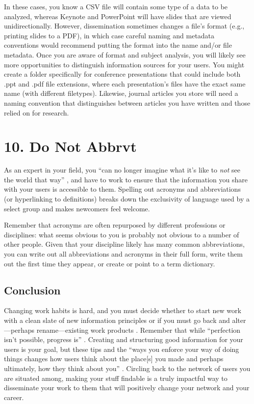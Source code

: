 \documentclass[10pt,letterpaper]{article}
\newcommand{\rulemajor}[1]{\section*{#1}}
\begin{document}
In these cases, you know a CSV file will contain some type of a data to be
analyzed, whereas Keynote and PowerPoint will have slides that are viewed
unidirectionally. However, dissemination sometimes changes a file's format
(e.g., printing slides to a PDF), in which case careful naming and metadata
conventions would recommend putting the format into the name and/or file
metadata. Once you are aware of format and subject analysis, you will likely see
more opportunities to distinguish information sources for your users. You might
create a folder specifically for conference presentations that could include
both .ppt and .pdf file extensions, where each presentation's files have the
exact same name (with different filetypes).  Likewise, journal articles you
store will need a naming convention that distinguishes between articles you have
written and those relied on for research.

\rulemajor{10. Do Not Abbrvt}

As an expert in your field, you ``can no longer imagine what it's like to
\emph{not} see the world that way'' \cite{Wilson2020}, and have to work to
ensure that the information you share with your users is accessible to
them. Spelling out acronyms and abbreviations (or hyperlinking to definitions)
breaks down the exclusivity of language used by a select group and makes
newcomers feel welcome.

Remember that acronyms are often repurposed by different professions or
disciplines: what seems obvious to you is probably not obvious to a number of
other people. Given that your discipline likely has many common abbreviations,
you can write out all abbreviations and acronyms in their full form, write them
out the first time they appear, or create or point to a term dictionary.

\subsection{Conclusion}

Changing work habits is hard, and you must decide whether to start new work with
a clean slate of new information principles or if you must go back and
alter---perhaps rename---existing work products \cite{Briney2015}.  Remember
that while ``perfection isn't possible, progress is'' \cite{Covert2014}.
Creating and structuring good information for your users is your goal, but these
tips and the ``ways you enforce your way of doing things changes how users think
about the place[s] you made and perhaps ultimately, how they think about you''
\cite{Covert2014}. Circling back to the network of users you are situated among,
making your stuff findable is a truly impactful way to disseminate your work to
them that will positively change your network and your career.


\end{document}
